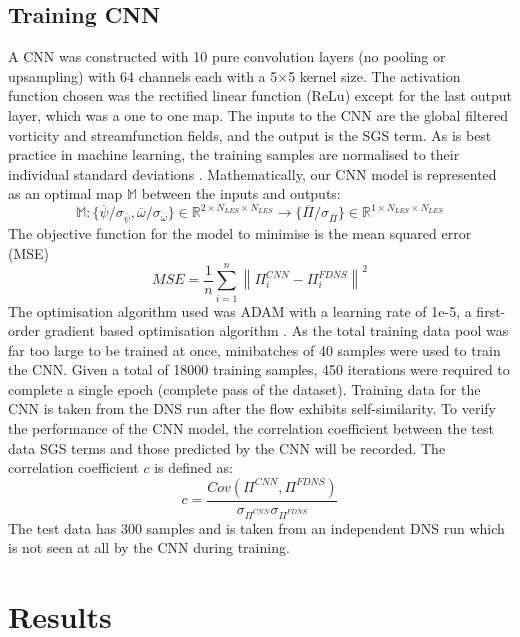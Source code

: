 \documentclass[conf]{new-aiaa}
\begin{document}
\subsection{Training CNN}
A CNN was constructed with 10 pure convolution layers (no pooling or upsampling) with 64 channels each with a 5$\times$5 kernel size. The activation function chosen was the rectified linear function (ReLu) except for the last output layer, which was a one to one map.
The inputs to the CNN are the global filtered vorticity and streamfunction fields, and the output is the SGS term. As is best practice in machine learning, the training samples are normalised to their individual standard deviations \cite{MLstandardise}. Mathematically, our CNN model is represented as an optimal map $\mathbb{M} $ between the inputs and outputs:
\begin{equation}
    \mathbb{M} : {\{ \overline{\psi}/\sigma_{\overline{\psi}},\overline{\omega}/\sigma_{\overline{\omega}}\}\in \mathbb{R}^{2\times N_{LES}\times N_{LES}} \rightarrow \{ \overline{\Pi}/\sigma_{\overline{\Pi}}\}\in \mathbb{R}^{1\times N_{LES}\times N_{LES}}}
\end{equation}
The objective function for the model to minimise is the mean squared error (MSE) 
\begin{equation}
    MSE = \frac{1}{n}\sum_{i = 1}^{n}\left\lVert \Pi^{CNN}_{i} - \Pi^{FDNS}_{i} \right\rVert ^{2}
\end{equation}
The optimisation algorithm used was ADAM with a learning rate of 1e-5, a first-order gradient based optimisation algorithm \cite{ADAM}. As the total training data pool was far too large to be trained at once, minibatches of 40 samples were used to train the CNN. Given a total of 18000 training samples, 450 iterations were required to complete a single epoch (complete pass of the dataset). Training data for the CNN is taken from the DNS run after the flow exhibits self-similarity. To verify the performance of the CNN model, the correlation coefficient between the test data SGS terms and those predicted by the CNN will be recorded. The correlation coefficient $c$ is defined as:
\begin{equation}
    c = \frac{Cov(\Pi^{CNN},\Pi^{FDNS})}{\sigma_{\Pi^{CNN}}\sigma_{\Pi^{FDNS}}}
\end{equation}
The test data has 300 samples and is taken from an independent DNS run which is not seen at all by the CNN during training.
\section{Results}
\end{document}
